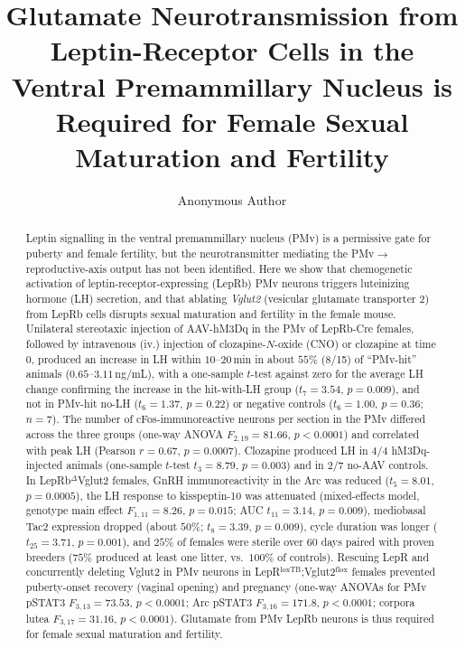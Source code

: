 \documentclass[11pt]{article}
\title{Glutamate Neurotransmission from Leptin-Receptor Cells in the Ventral Premammillary Nucleus is Required for Female Sexual Maturation and Fertility}
\author[1]{Anonymous Author}
\affil[1]{Anonymous Institution}
\date{}
\begin{document}
\maketitle

\begin{abstract}
Leptin signalling in the ventral premammillary nucleus (PMv) is a permissive gate for puberty and female fertility, but the neurotransmitter mediating the PMv$\to$reproductive-axis output has not been identified. Here we show that chemogenetic activation of leptin-receptor-expressing (LepRb) PMv neurons triggers luteinizing hormone (LH) secretion, and that ablating \textit{Vglut2} (vesicular glutamate transporter 2) from LepRb cells disrupts sexual maturation and fertility in the female mouse. Unilateral stereotaxic injection of AAV-hM3Dq in the PMv of LepRb-Cre females, followed by intravenous (iv.) injection of clozapine-$N$-oxide (CNO) or clozapine at time $0$, produced an increase in LH within $10$--$20$\,min in about $55\%$ (8/15) of ``PMv-hit'' animals ($0.65$--$3.11$\,ng/mL), with a one-sample $t$-test against zero for the average LH change confirming the increase in the hit-with-LH group ($t_7 = 3.54$, $p = 0.009$), and not in PMv-hit no-LH ($t_6 = 1.37$, $p = 0.22$) or negative controls ($t_6 = 1.00$, $p = 0.36$; $n = 7$). The number of cFos-immunoreactive neurons per section in the PMv differed across the three groups (one-way ANOVA $F_{2,19} = 81.66$, $p < 0.0001$) and correlated with peak LH (Pearson $r = 0.67$, $p = 0.0007$). Clozapine produced LH in $4/4$ hM3Dq-injected animals (one-sample $t$-test $t_3 = 8.79$, $p = 0.003$) and in $2/7$ no-AAV controls. In LepRb$^{\Delta}$Vglut2 females, GnRH immunoreactivity in the Arc was reduced ($t_5 = 8.01$, $p = 0.0005$), the LH response to kisspeptin-10 was attenuated (mixed-effects model, genotype main effect $F_{1,11} = 8.26$, $p = 0.015$; AUC $t_{11} = 3.14$, $p = 0.009$), mediobasal Tac2 expression dropped (about $50\%$; $t_8 = 3.39$, $p = 0.009$), cycle duration was longer ($t_{25} = 3.71$, $p = 0.001$), and $25\%$ of females were sterile over $60$ days paired with proven breeders ($75\%$ produced at least one litter, vs.\ $100\%$ of controls). Rescuing LepR and concurrently deleting Vglut2 in PMv neurons in LepR$^{\mathrm{loxTB}}$;Vglut2$^{\mathrm{flox}}$ females prevented puberty-onset recovery (vaginal opening) and pregnancy (one-way ANOVAs for PMv pSTAT3 $F_{3,13} = 73.53$, $p < 0.0001$; Arc pSTAT3 $F_{3,16} = 171.8$, $p < 0.0001$; corpora lutea $F_{3,17} = 31.16$, $p < 0.0001$). Glutamate from PMv LepRb neurons is thus required for female sexual maturation and fertility.
\end{abstract}
\end{document}
